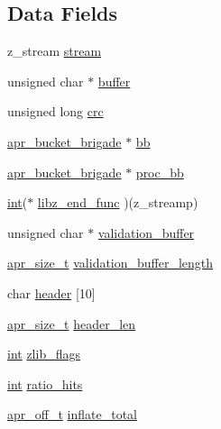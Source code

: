 \subsection*{Data Fields}
\begin{DoxyCompactItemize}
\item 
z\+\_\+stream \hyperlink{structdeflate__ctx__t_a9d805231805fa088e903c6b53ff2b292}{stream}
\item 
unsigned char $\ast$ \hyperlink{structdeflate__ctx__t_ac1c0564ce03d6f7feec2f79932be3a6a}{buffer}
\item 
unsigned long \hyperlink{structdeflate__ctx__t_ac13119619aed9d0819da9b39e9eb88f4}{crc}
\item 
\hyperlink{structapr__bucket__brigade}{apr\+\_\+bucket\+\_\+brigade} $\ast$ \hyperlink{structdeflate__ctx__t_a46db9bdb2455b8b07131e9d86ece12e6}{bb}
\item 
\hyperlink{structapr__bucket__brigade}{apr\+\_\+bucket\+\_\+brigade} $\ast$ \hyperlink{structdeflate__ctx__t_a5a45fed97d5d73a7d9babb134e38f77e}{proc\+\_\+bb}
\item 
\hyperlink{pcre_8txt_a42dfa4ff673c82d8efe7144098fbc198}{int}($\ast$ \hyperlink{structdeflate__ctx__t_a5e333da99e230c25d0ef0d58e357df91}{libz\+\_\+end\+\_\+func} )(z\+\_\+streamp)
\item 
unsigned char $\ast$ \hyperlink{structdeflate__ctx__t_a6060d8aaf13c26a363ec85e12a835c7e}{validation\+\_\+buffer}
\item 
\hyperlink{group__apr__platform_gaaa72b2253f6f3032cefea5712a27540e}{apr\+\_\+size\+\_\+t} \hyperlink{structdeflate__ctx__t_a7c771547f7bb81b933407d75c31447b3}{validation\+\_\+buffer\+\_\+length}
\item 
char \hyperlink{structdeflate__ctx__t_a85200d446b60e0bdbc99837ef4bd5629}{header} \mbox{[}10\mbox{]}
\item 
\hyperlink{group__apr__platform_gaaa72b2253f6f3032cefea5712a27540e}{apr\+\_\+size\+\_\+t} \hyperlink{structdeflate__ctx__t_a7454e0023a849b9f5d573da6c12b5a11}{header\+\_\+len}
\item 
\hyperlink{pcre_8txt_a42dfa4ff673c82d8efe7144098fbc198}{int} \hyperlink{structdeflate__ctx__t_a35639fc005830dbcd90cd40d91bbabae}{zlib\+\_\+flags}
\item 
\hyperlink{pcre_8txt_a42dfa4ff673c82d8efe7144098fbc198}{int} \hyperlink{structdeflate__ctx__t_a6ebf0152858300909a54cdaf5b27b272}{ratio\+\_\+hits}
\item 
\hyperlink{group__apr__platform_ga6938af9075cec15c88299109381aa984}{apr\+\_\+off\+\_\+t} \hyperlink{structdeflate__ctx__t_ab15ce529c4e1432d5648caafc6e38dd8}{inflate\+\_\+total}

\end{DoxyCompactItemize}
